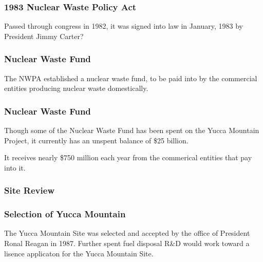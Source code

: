 
\begin{frame}[ctb!]
  \frametitle{1983 Nuclear Waste Policy Act}
  Passed through congress in 1982, it was signed into law in January, 1983 by 
  President Jimmy Carter?


\end{frame}

\begin{frame}[ctb!]
  \frametitle{Nuclear Waste Fund}
  The NWPA established a nuclear waste fund, to be paid into by the commercial 
  entities producing nuclear waste domestically.
\end{frame}

\begin{frame}[ctb!]
  \frametitle{Nuclear Waste Fund}
  Though some of the Nuclear Waste Fund has been spent on the Yucca Mountain 
  Project, it currently has an unspent balance of \$25 billion. 

  It receives nearly \$750 million each year from the commerical entities that 
  pay into it.
\end{frame}


\begin{frame}[ctb!]
  \frametitle{Site Review}
  
\end{frame}

\begin{frame}[ctb!]
  \frametitle{Selection of Yucca Mountain}

  The Yucca Mountain Site was selected and accepted by the office of President 
  Ronal Reagan in 1987. Further spent fuel disposal R\&D would work toward a 
  lisence applicaton for the Yucca Mountain Site. 
  
\end{frame}
